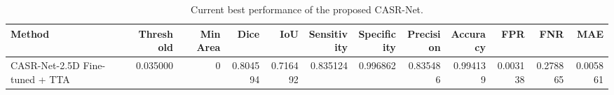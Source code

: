 \begin{table}
\caption{Current best performance of the proposed CASR-Net.}
\label{tab:current_best_casrnet}
\begin{tabular}{lrrrrrrrrrrr}
\toprule
Method & Threshold & Min Area & Dice & IoU & Sensitivity & Specificity & Precision & Accuracy & FPR & FNR & MAE \\
\midrule
CASR-Net-2.5D Fine-tuned + TTA & 0.035000 & 0 & 0.804594 & 0.716492 & 0.835124 & 0.996862 & 0.835486 & 0.994139 & 0.003138 & 0.278865 & 0.005861 \\
\bottomrule
\end{tabular}
\end{table}

